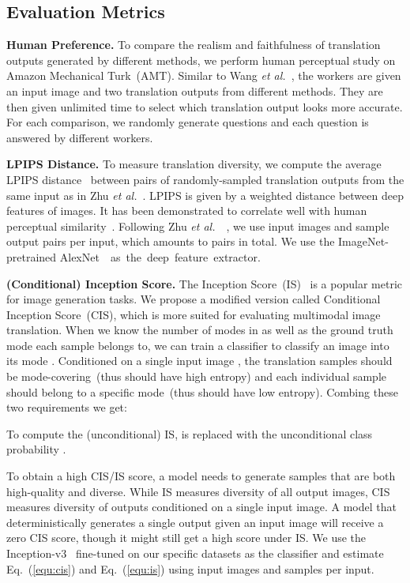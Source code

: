 \documentclass[runningheads]{llncs}
\newcommand{\vpara}[1]{\vspace{0.05in}\noindent\textbf{#1}}
\def\etal{\emph{et al.}\xspace}
\begin{document}
	
\subsection{Evaluation Metrics}
	\label{sec:metrics}
\vpara{Human Preference.} To compare the realism and faithfulness of translation outputs generated by different methods, we perform human perceptual study on Amazon Mechanical Turk~(AMT). Similar to Wang \etal~\cite{wang2018high}, the workers are given an input image and two translation outputs from different methods. They are then given unlimited time to select which translation output looks more accurate. For each comparison, we randomly generate  questions and each question is answered by  different workers. 


	\vpara{LPIPS Distance.} To measure translation diversity, we compute the average LPIPS distance~\cite{zhang2018unreasonable} between pairs of randomly-sampled translation outputs from the same input as in Zhu \etal~\cite{zhu2017toward}. LPIPS is given by a weighted  distance between deep features of images. It has been demonstrated to correlate well with human perceptual similarity~\cite{zhang2018unreasonable}. Following Zhu \etal~~\cite{zhu2017toward}, we use  input images and sample  output pairs per input, which amounts to  pairs in total. We use the ImageNet-pretrained \mbox{AlexNet~\cite{krizhevsky2012imagenet} as the deep feature extractor.}
	
	\vpara{(Conditional) Inception Score.} The Inception Score~(IS)~\cite{salimans2016improved} is a popular metric for image generation tasks. We propose a modified version called Conditional Inception Score~(CIS), which is more suited for evaluating multimodal image translation. When we know the number of modes in  as well as the ground truth mode each sample belongs to, we can train a classifier  to classify an image  into its mode . Conditioned on a single input image , the translation samples  should be mode-covering~(thus  should have high entropy) and each individual sample should belong to a specific mode~(thus  should have low entropy). Combing these two requirements we get:
	 
	To compute the (unconditional) IS,  is replaced with the unconditional class probability . 
	 
	To obtain a high CIS/IS score, a model needs to generate samples that are both high-quality and diverse. While IS measures diversity of all output images, CIS measures diversity of outputs conditioned on a single input image. A model that deterministically generates a single output given an input image will receive a zero CIS score, though it might still get a high score under IS. We use the Inception-v3~\cite{szegedy2016rethinking} fine-tuned on our specific datasets as the classifier and estimate Eq.~(\ref{equ:cis}) and Eq.~(\ref{equ:is}) using  input images and  samples per input. 
\end{document}
